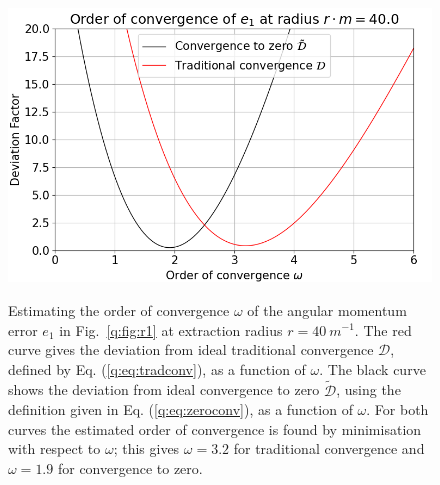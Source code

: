\begin{figure}[h]
{\includegraphics[width=0.65\columnwidth]{png/conv_order_40.0.png}}
\caption{Estimating the order of convergence $\omega$ of the angular momentum error $e_1$ in Fig.~\ref{q:fig:r1} at extraction radius $r=40 ~m^{-1}$. The red curve gives the deviation from ideal traditional convergence $\mathcal{D}$, defined by Eq. (\ref{q:eq:tradconv}), as a function of $\omega$. The black curve shows the deviation from ideal convergence to zero $\tilde{\mathcal{D}}$, using the definition given in Eq. (\ref{q:eq:zeroconv}), as a function of $\omega$.  For both curves the estimated order of convergence is found by minimisation with respect to $\omega$; this gives $\omega=3.2$ for traditional convergence and $\omega=1.9$ for convergence to zero. }
\label{q:fig:D}
\end{figure}














